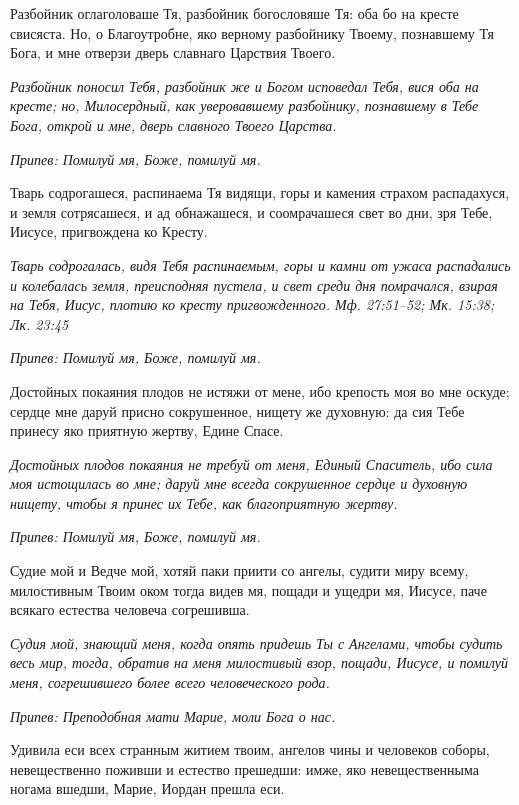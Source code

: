 Разбойник оглаголоваше Тя, разбойник богословяше Тя: оба бо на кресте свисяста. Но, о Благоутробне, яко верному разбойнику Твоему, познавшему Тя Бога, и мне отверзи дверь славнаго Царствия Твоего.


\itshape Разбойник поносил Тебя, разбойник же и Богом исповедал Тебя, вися оба на кресте; но, Милосердный, как уверовавшему разбойнику, познавшему в Тебе Бога, открой и мне, дверь славного Твоего Царства.\normalfont{}


\itshape Припев:\normalfont{} Помилуй мя, Боже, помилуй мя.


Тварь содрогашеся, распинаема Тя видящи, горы и камения страхом распадахуся, и земля сотрясашеся, и ад обнажашеся, и соомрачашеся свет во дни, зря Тебе, Иисусе, пригвождена ко Кресту.


\itshape Тварь содрогалась, видя Тебя распинаемым, горы и камни от ужаса распадались и колебалась земля, преисподняя пустела, и свет среди дня помрачался, взирая на Тебя, Иисус, плотию ко кресту пригвожденного. Мф. 27:51–52; Мк. 15:38; Лк. 23:45\normalfont{}


\itshape Припев:\normalfont{} Помилуй мя, Боже, помилуй мя.


Достойных покаяния плодов не истяжи от мене, ибо крепость моя во мне оскуде; сердце мне даруй присно сокрушенное, нищету же духовную: да сия Тебе принесу яко приятную жертву, Едине Спасе.


\itshape Достойных плодов покаяния не требуй от меня, Единый Спаситель, ибо сила моя истощилась во мне; даруй мне всегда сокрушенное сердце и духовную нищету, чтобы я принес их Тебе, как благоприятную жертву.\normalfont{}


\itshape Припев:\normalfont{} Помилуй мя, Боже, помилуй мя.


Судие мой и Ведче мой, хотяй паки приити со ангелы, судити миру всему, милостивным Твоим оком тогда видев мя, пощади и ущедри мя, Иисусе, паче всякаго естества человеча согрешивша.


\itshape Судия мой, знающий меня, когда опять придешь Ты с Ангелами, чтобы судить весь мир, тогда, обратив на меня милостивый взор, пощади, Иисусе, и помилуй меня, согрешившего более всего человеческого рода.\normalfont{}


\itshape Припев:\normalfont{} Преподобная мати Марие, моли Бога о нас.


Удивила еси всех странным житием твоим, ангелов чины и человеков соборы, невещественно поживши и естество прешедши: имже, яко невещественныма ногама вшедши, Марие, Иордан прешла еси.


